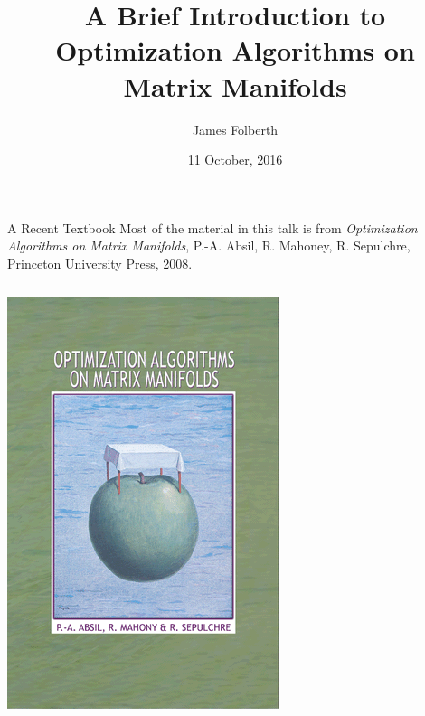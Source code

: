 \documentclass[xcolor=dvipsnames,t]{beamer} %
\title{A Brief Introduction to Optimization Algorithms on Matrix Manifolds}
\date{11 October, 2016}
\author{James Folberth}
\begin{document}
\begin{frame}
\maketitle
\end{frame}


\begin{frame}{A Recent Textbook}
   Most of the material in this talk is from \emph{Optimization Algorithms on Matrix Manifolds}, P.-A. Absil, R. Mahoney, R. Sepulchre, Princeton University Press, 2008.\\
   
   \begin{columns}
      \begin{column}{0.4\textwidth}
         \begin{center}
            \includegraphics[width=0.8\columnwidth]{figures/oaomm_cover.png}
         \end{center}


\end{column}
\end{columns}
\end{frame}
\end{document}

